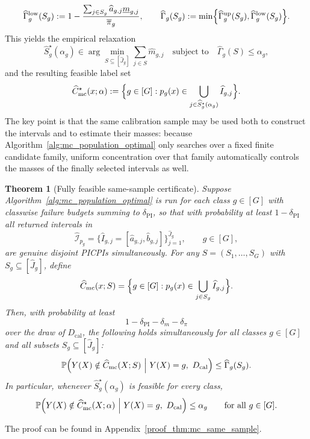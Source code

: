 \documentclass[11pt]{article}
\theoremstyle{statplain}
\newtheorem{theorem}{Theorem}[section]
\theoremstyle{statdefinition}
\newcommand{\mc}{\mathrm{mc}}
\newcommand{\PP}{\mathbb{P}}
\newcommand{\0}{\mathbf{0}}
\newcommand{\I}{\mathcal{I}}
\newcommand{\intervalset}{\I} %
\newcommand{\numClass}{G} %
\newcommand{\iteratorClass}{g}
\newcommand{\titleShorts}{PICPIs\xspace}
\begin{document}
\[
\widehat\Gamma_{\iteratorClass}^{\mathrm{low}}(S_\iteratorClass)
:=
1-
\frac{
\sum_{j\in S_\iteratorClass}\widehat a_{\iteratorClass,j}\underline m_{\iteratorClass,j}
}{\overline\pi_\iteratorClass},
\qquad
\widehat\Gamma_{\iteratorClass}(S_\iteratorClass)
:=
\min\Bigl\{
\widehat\Gamma_{\iteratorClass}^{\mathrm{up}}(S_\iteratorClass),
\widehat\Gamma_{\iteratorClass}^{\mathrm{low}}(S_\iteratorClass)
\Bigr\}.
\]
This yields the empirical relaxation
\[
\widehat S_\iteratorClass^\star(\alpha_\iteratorClass)
\in
\arg\min_{S\subseteq[\widehat J_\iteratorClass]}
\sum_{j\in S}\widehat m_{\iteratorClass,j}
\quad \text{subject to}\quad
\widehat\Gamma_{\iteratorClass}(S)\le \alpha_\iteratorClass,
\]
and the resulting feasible label set
\[
\widehat C_{\mc}^\star(x;\alpha)
:=
\Bigl\{\iteratorClass\in[\numClass]:
p_\iteratorClass(x)\in
\bigcup_{j\in \widehat S_\iteratorClass^\star(\alpha_\iteratorClass)}
\widehat I_{\iteratorClass,j}
\Bigr\}.
\]
The key point is that the same calibration sample may be used both to construct the intervals and to estimate their masses: because Algorithm~\ref{alg:mc_population_optimal} only searches over a fixed finite candidate family, uniform concentration over that family automatically controls the masses of the finally selected intervals as well.

\begin{theorem}[Fully feasible same-sample certificate]\label{thm:mc_same_sample}
Suppose Algorithm~\ref{alg:mc_population_optimal} is run for each class $\iteratorClass\in[\numClass]$ with classwise failure budgets summing to $\delta_{\mathrm{PI}}$, so that with probability at least $1-\delta_{\mathrm{PI}}$ all returned intervals in
\[
\widehat{\intervalset}_{p_\iteratorClass}
=
\bigl\{
\widehat I_{\iteratorClass,j}
=
[\widehat a_{\iteratorClass,j},\widehat b_{\iteratorClass,j}]
\bigr\}_{j=1}^{\widehat J_\iteratorClass},
\qquad
\iteratorClass\in[\numClass],
\]
are genuine disjoint \titleShorts simultaneously.
For any $S=(S_1,\ldots,S_\numClass)$ with $S_\iteratorClass\subseteq [\widehat J_\iteratorClass]$, define
\[
\widehat C_{\mc}(x;S)
=
\Bigl\{
\iteratorClass\in[\numClass]:
p_\iteratorClass(x)\in
\bigcup_{j\in S_\iteratorClass}\widehat I_{\iteratorClass,j}
\Bigr\}.
\]
Then, with probability at least
\[
1-\delta_{\mathrm{PI}}-\delta_m-\delta_\pi
\]
over the draw of $D_{\mathrm{cal}}$, the following holds simultaneously for all classes $\iteratorClass\in[\numClass]$ and all subsets $S_\iteratorClass\subseteq[\widehat J_\iteratorClass]$:
\[
\PP\Bigl(
Y(X)\notin \widehat C_{\mc}(X;S)
\ \Big|\ 
Y(X)=\iteratorClass,\ D_{\mathrm{cal}}
\Bigr)
\le
\widehat\Gamma_{\iteratorClass}(S_\iteratorClass).
\]
In particular, whenever $\widehat S_\iteratorClass^\star(\alpha_\iteratorClass)$ is feasible for every class,
\[
\PP\Bigl(
Y(X)\notin \widehat C_{\mc}^\star(X;\alpha)
\ \Big|\ 
Y(X)=\iteratorClass,\ D_{\mathrm{cal}}
\Bigr)
\le
\alpha_\iteratorClass
\qquad
\text{for all }\iteratorClass\in[\numClass].
\]
\end{theorem}
The proof can be found in 
Appendix~\ref{proof_thm:mc_same_sample}.
\end{document}
